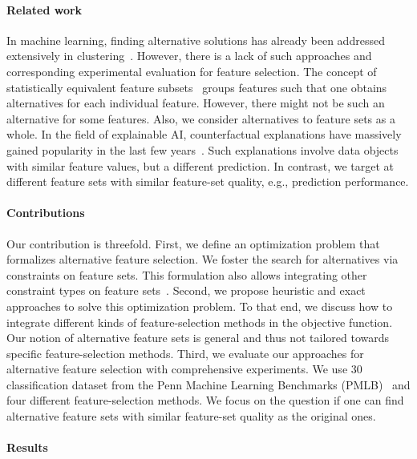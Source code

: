 \documentclass{article}
\theoremstyle{definition}
\begin{document}
\paragraph{Related work}

In machine learning, finding alternative solutions has already been addressed extensively in clustering~\cite{bae2006coala}.
However, there is a lack of such approaches and corresponding experimental evaluation for feature selection.
The concept of statistically equivalent feature subsets~\cite{lagani2017feature} groups features such that one obtains alternatives for each individual feature.
However, there might not be such an alternative for some features.
Also, we consider alternatives to feature sets as a whole.
In the field of explainable AI, counterfactual explanations have massively gained popularity in the last few years~\cite{verma2020counterfactual, stepin2021survey}.
Such explanations involve data objects with similar feature values, but a different prediction.
In contrast, we target at different feature sets with similar feature-set quality, e.g., prediction performance.

\paragraph{Contributions}

Our contribution is threefold.
First, we define an optimization problem that formalizes alternative feature selection.
We foster the search for alternatives via constraints on feature sets.
This formulation also allows integrating other constraint types on feature sets~\cite{paclik2002feature,yuan2006model,groves2015toward}.
Second, we propose heuristic and exact approaches to solve this optimization problem.
To that end, we discuss how to integrate different kinds of feature-selection methods in the objective function.
Our notion of alternative feature sets is general and thus not tailored towards specific feature-selection methods.
Third, we evaluate our approaches for alternative feature selection with comprehensive experiments.
We use 30 classification dataset from the Penn Machine Learning Benchmarks (PMLB)~\cite{olson2017pmlb, romano2021pmlb} and four different feature-selection methods.
We focus on the question if one can find alternative feature sets with similar feature-set quality as the original ones.

\paragraph{Results}
\end{document}
